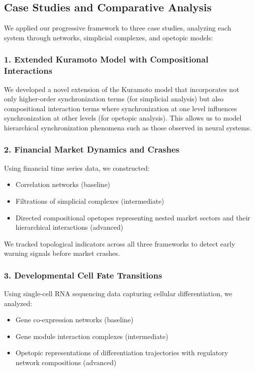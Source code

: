 \subsection{Case Studies and Comparative Analysis}
We applied our progressive framework to three case studies, analyzing each system through networks, simplicial complexes, and opetopic models:

\subsubsection{1. Extended Kuramoto Model with Compositional Interactions}
We developed a novel extension of the Kuramoto model that incorporates not only higher-order synchronization terms (for simplicial analysis) but also compositional interaction terms where synchronization at one level influences synchronization at other levels (for opetopic analysis). This allows us to model hierarchical synchronization phenomena such as those observed in neural systems.

\subsubsection{2. Financial Market Dynamics and Crashes}
Using financial time series data, we constructed:
\begin{itemize}
  \item Correlation networks (baseline)
  \item Filtrations of simplicial complexes (intermediate)
  \item Directed compositional opetopes representing nested market sectors and their hierarchical interactions (advanced)
\end{itemize}

We tracked topological indicators across all three frameworks to detect early warning signals before market crashes.

\subsubsection{3. Developmental Cell Fate Transitions}
Using single-cell RNA sequencing data capturing cellular differentiation, we analyzed:
\begin{itemize}
  \item Gene co-expression networks (baseline)
  \item Gene module interaction complexes (intermediate)
  \item Opetopic representations of differentiation trajectories with regulatory network compositions (advanced)
\end{itemize}

